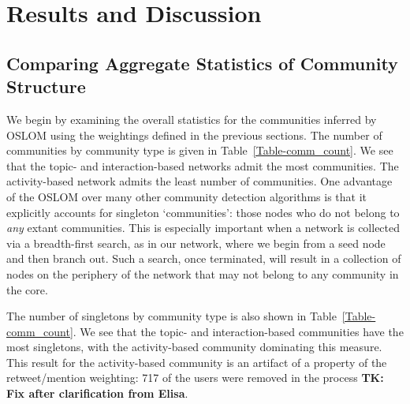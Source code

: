 \section{Results and Discussion}

\subsection{Comparing Aggregate Statistics of Community Structure}

We begin by examining the overall statistics for the communities inferred by OSLOM using the weightings defined in the previous sections. The number of communities by community type is given in Table~\ref{Table-comm_count}. We see that the topic- and interaction-based networks admit the most communities. The activity-based network admits the least number of communities.  One advantage of the OSLOM over many other community detection algorithms is that it explicitly accounts for singleton `communities': those nodes who do not belong to \emph{any} extant communities. This is especially important when a network is collected via a breadth-first search, as in our network, where we begin from a seed node and then branch out. Such a search, once terminated, will result in a collection of nodes on the periphery of the network that may not belong to any community in the core.


The number of singletons by community type is also shown in Table~\ref{Table-comm_count}. We see that the topic- and interaction-based communities have the most singletons, with the activity-based community dominating this measure. This result for the activity-based community is an artifact of a property of the retweet/mention weighting: 717 of the users were removed in the process \textbf{TK: Fix after clarification from Elisa}.


